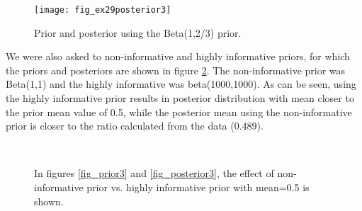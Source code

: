 \documentclass[a4paper]{article}
\begin{document}
\begin{figure}[ht]
  \begin{center}
      \texttt{[image: fig\_ex29posterior3]}
    \caption{Prior and posterior using the Beta(1,2/3) prior.}\label{fig:post3}   
 \end{center}
\end{figure}

We
were also asked to non-informative and highly informative priors, for which
the priors and posteriors are shown in figure \ref{fig:priors3}. The
non-informative prior was Beta(1,1) and the highly informative was
beta(1000,1000). As can be seen, using the highly informative prior results
in posterior distribution with mean closer to the prior mean value of 0.5,
while the posterior mean using the non-informative prior is closer to the
ratio calculated from the data (0.489).

\begin{figure}[ht]
  \begin{center}
    ~
    \caption{    %
      In figures \ref{fig_prior3} and \ref{fig_posterior3}, the effect of
non-informative prior vs. highly informative prior with mean=0.5 is
shown.}\label{fig:priors3}   
 \end{center}
\end{figure}
\end{document}
